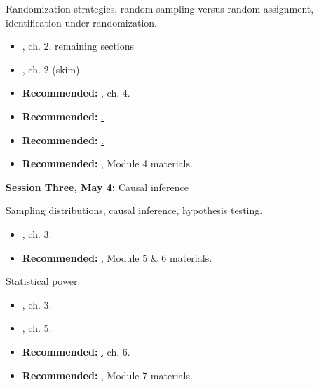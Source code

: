 \documentclass[10pt]{article}
\begin{document}
Randomization strategies, random sampling versus random assignment, identification under randomization.

\begin{itemize}
    \item {}, ch. 2, remaining sections
    \item \href{https://www-jstor-org.eui.idm.oclc.org/stable/j.ctt21c4v92}{,} ch. 2 (skim).
    \item \textbf{Recommended:}  \href{https://www-jstor-org.eui.idm.oclc.org/stable/j.ctt4cgd52}{,} ch. 4.
    \item \textbf{Recommended:} \href{https://www-cambridge-org.eui.idm.oclc.org/core/journals/world-politics/article/abs/clientelism-and-voting-behavior-evidence-from-a-field-experiment-in-benin/3E386064D15E5E162AEDCEBECB32E8CB}{.}
    \item \textbf{Recommended:}
        \href{https://www-jstor-org.eui.idm.oclc.org/stable/42919295?refreqid=excelsior%3A32c7205b7355e1d97bde057069a83600&seq=1}{\fullcite{collier2014votes}.}
        \item \textbf{Recommended:}
            \href{https://egap.github.io/theory_and_practice_of_field_experiments/randomization.html}{}, Module 4 materials.
\end{itemize}

\textbf{Session Three, May 4: } Causal inference

Sampling distributions, causal inference, hypothesis testing.

\begin{itemize}
    \item {}, ch. 3.
    \item \textbf{Recommended:}
        \href{https://egap.github.io/theory_and_practice_of_field_experiments/}{},
        Module 5 \& 6 materials.
\end{itemize}

Statistical power.

\begin{itemize}
    \item {}, ch. 3.
    \item \href{https://www-jstor-org.eui.idm.oclc.org/stable/j.ctt21c4v92}{\cite{karlan16},} ch. 5.
    \item \textbf{Recommended:}  \href{https://www-jstor-org.eui.idm.oclc.org/stable/j.ctt4cgd52}{,} ch. 6.
    \item \textbf{Recommended:}
        \href{https://egap.github.io/theory_and_practice_of_field_experiments/}{\cite{bowersVoorsIchino2021book}},
        Module 7 materials.
\end{itemize}
\end{document}
